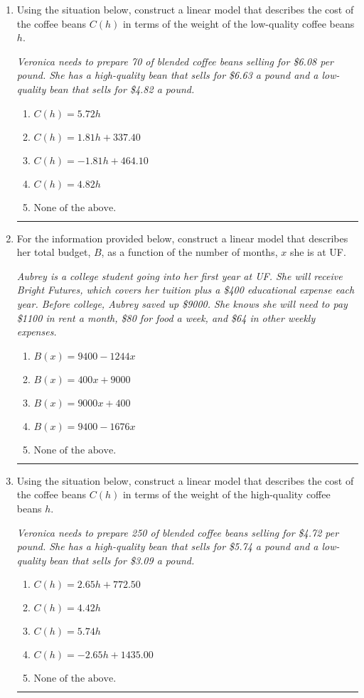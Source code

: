 \documentclass[14pt]{extbook}
\newcommand{\litem}[1]{\item#1\hspace*{-1cm}\rule{\textwidth}{0.4pt}}
\begin{document}
\begin{enumerate}
{\begin{enumerate}[label=\Alph*.]
\end{enumerate} }
\litem{
Using the situation below, construct a linear model that describes the cost of the coffee beans $C(h)$ in terms of the weight of the low-quality coffee beans $h$.
\begin{center}
    \textit{ Veronica needs to prepare 70 of blended coffee beans selling for \$6.08 per pound. She has a high-quality bean that sells for \$6.63 a pound and a low-quality bean that sells for \$4.82 a pound. }
\end{center}
\begin{enumerate}[label=\Alph*.]
\item \( C(h) = 5.72 h \)
\item \( C(h) = 1.81 h + 337.40 \)
\item \( C(h) = -1.81 h + 464.10 \)
\item \( C(h) = 4.82 h \)
\item \( \text{None of the above.} \)

\end{enumerate} }
\litem{
For the information provided below, construct a linear model that describes her total budget, $B$, as a function of the number of months, $x$ she is at UF.
\begin{center}
    \textit{ Aubrey is a college student going into her first year at UF. She will receive Bright Futures, which covers her tuition plus a \$400 educational expense each year. Before college, Aubrey saved up \$9000. She knows she will need to pay \$1100 in rent a month, \$80 for food a week, and \$64 in other weekly expenses. }
\end{center}
\begin{enumerate}[label=\Alph*.]
\item \( B(x) = 9400 - 1244 x \)
\item \( B(x) = 400 x + 9000 \)
\item \( B(x) = 9000 x + 400 \)
\item \( B(x) = 9400 - 1676 x \)
\item \( \text{None of the above.} \)

\end{enumerate} }
\litem{
Using the situation below, construct a linear model that describes the cost of the coffee beans $C(h)$ in terms of the weight of the high-quality coffee beans $h$.
\begin{center}
    \textit{ Veronica needs to prepare 250 of blended coffee beans selling for \$4.72 per pound. She has a high-quality bean that sells for \$5.74 a pound and a low-quality bean that sells for \$3.09 a pound. }
\end{center}
\begin{enumerate}[label=\Alph*.]
\item \( C(h) = 2.65 h + 772.50 \)
\item \( C(h) = 4.42 h \)
\item \( C(h) = 5.74 h \)
\item \( C(h) = -2.65 h + 1435.00 \)
\item \( \text{None of the above.} \)


\end{enumerate}}
\end{enumerate}
\end{document}
